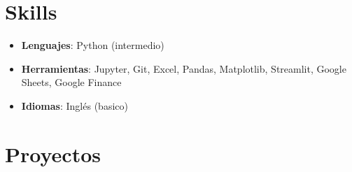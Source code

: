 \documentclass[11pt, a4paper]{article}
\begin{document}
\section*{Skills}
\begin{itemize}[leftmargin=*]
    \item \textbf{Lenguajes}: Python (intermedio)
    \item \textbf{Herramientas}: Jupyter, Git, Excel, Pandas, Matplotlib, Streamlit, Google Sheets, Google Finance
    \item \textbf{Idiomas}: Inglés (basico)
\end{itemize}

\section*{Proyectos}
\end{document}
